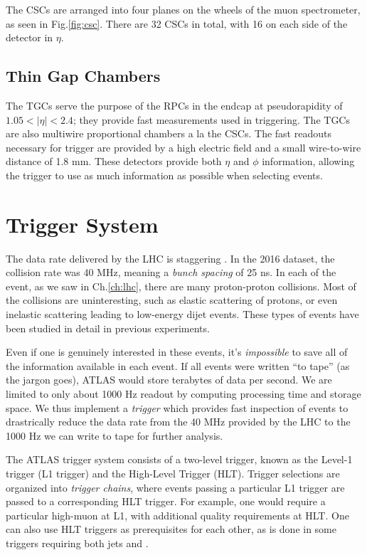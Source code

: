 The CSCs are arranged into four planes on the wheels of the muon spectrometer, as seen in Fig.\ref{fig:csc}.
There are 32 CSCs in total, with 16 on each side of the detector in $\eta.$

\subsection{Thin Gap Chambers}

The TGCs serve the purpose of the RPCs in the endcap at pseudorapidity of $1.05 < |\eta| < 2.4 $; they provide fast measurements used in triggering.
The TGCs are also multiwire proportional chambers a la the CSCs.
The fast readouts necessary for trigger are provided by a high electric field and a small wire-to-wire distance of 1.8 mm.
These detectors provide both $\eta$ and $\phi$ information, allowing the trigger to use as much information as possible when selecting events.

\section{Trigger System}\label{sec:trigger}

The data rate delivered by the LHC is staggering \cite{ATL-DAQ-PUB-2016-001}.
In the 2016 dataset, the collision rate was 40 MHz, meaning a \textit{bunch spacing} of 25 ns.
In each of the event, as we saw in Ch.\ref{ch:lhc}, there are many proton-proton collisions.
Most of the collisions are uninteresting, such as elastic scattering of protons, or even inelastic scattering leading to low-energy dijet events.
These types of events have been studied in detail in previous experiments.

Even if one is genuinely interested in these events, it's \textit{impossible} to save all of the information available in each event.
If all events were written ``to tape'' (as the jargon goes), ATLAS would store terabytes of data per second.
We are limited to only about 1000 Hz readout by computing processing time and storage space.
We thus implement a \textit{trigger} which provides fast inspection of events to drastrically reduce the data rate from the 40 MHz provided by the LHC to the 1000 Hz we can write to tape for further analysis.

The ATLAS trigger system consists of a two-level trigger, known as the Level-1 trigger (L1 trigger) and the High-Level Trigger (HLT)\footnotemark.
Trigger selections are organized into \textit{trigger chains}, where events passing a particular L1 trigger are passed to a corresponding HLT trigger.
For example, one would require a particular high-\pt muon at L1, with additional quality requirements at HLT.
One can also use HLT triggers as prerequisites for each other, as is done in some triggers requiring both jets and \met.

